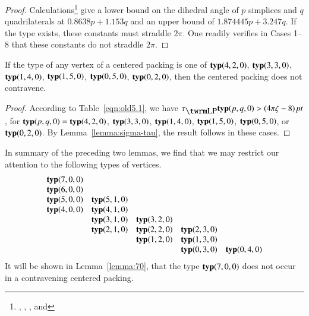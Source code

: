 \begin{proof}
Calculations\footnote{, ,
, and } give a lower bound on the
dihedral angle of $p$ simplices and $q$ quadrilaterals at
$0.8638p+1.153 q$ and an upper bound of $1.874445 p + 3.247 q$. If
the type exists, these constants must straddle $2\pi$. One readily
verifies in Cases 1--8 that these constants do not straddle
$2\pi$.
\end{proof}

\begin{lemma}
    \label{lemma:pq-types}
If the type of any vertex of a centered packing is one of
${\operatorname{\bf typ}}{(4,2,0)}$, ${\operatorname{\bf typ}}{(3,3,0)}$, ${\operatorname{\bf typ}}{(1,4,0)}$, ${\operatorname{\bf typ}}{(1,5,0)}$, ${\operatorname{\bf typ}}{(0,5,0)}$, ${\operatorname{\bf typ}}{(0,2,0)}$, %
then the centered packing does not contravene.
\end{lemma}


\begin{proof}  According to Table~\ref{eqn:old5.1},
we have $\tlp\pqr{(p,q,0)}> \squander$, for ${\operatorname{\bf typ}}{(p,q,0)} = {\operatorname{\bf typ}}{(4,2,0)}$, ${\operatorname{\bf typ}}{(3,3,0)}$,
${\operatorname{\bf typ}}{(1,4,0)}$, ${\operatorname{\bf typ}}{(1,5,0)}$, ${\operatorname{\bf typ}}{(0,5,0)}$, or ${\operatorname{\bf typ}}{(0,2,0)}$. By
Lemma~\ref{lemma:sigma-tau}, the result follows in these cases.
\end{proof}



\begin{remark} \label{rem:pq-list}
In summary of the preceding two lemmas, we find that we may
restrict our attention to the following types of vertices.
    $$
    \begin{matrix}
   {\operatorname{\bf typ}}{(7,0,0)}&      &       &       &       \\
   {\operatorname{\bf typ}}{(6,0,0)}&      &       &       &       \\
   {\operatorname{\bf typ}}{(5,0,0)}&{\operatorname{\bf typ}}{(5,1,0)} &       &       &       \\
   {\operatorname{\bf typ}}{(4,0,0)}&{\operatorname{\bf typ}}{(4,1,0)} &       &       &       \\
        &{\operatorname{\bf typ}}{(3,1,0)} &{\operatorname{\bf typ}}{(3,2,0)}  &       &       \\
        &{\operatorname{\bf typ}}{(2,1,0)} &{\operatorname{\bf typ}}{(2,2,0)}  &{\operatorname{\bf typ}}{(2,3,0)}  &       \\
        &      &{\operatorname{\bf typ}}{(1,2,0)}  &{\operatorname{\bf typ}}{(1,3,0)}  &       \\
        &      &       &{\operatorname{\bf typ}}{(0,3,0)}  &{\operatorname{\bf typ}}{(0,4,0)}  \\
    \end{matrix}
    $$
It will be shown in Lemma~\ref{lemma:70}, that the type ${\operatorname{\bf typ}}{(7,0,0)}$
does not occur in a contravening centered packing.
\end{remark}


